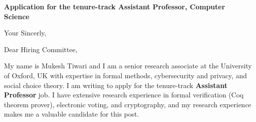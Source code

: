 \documentclass[11pt,a4paper,roman]{moderncv}
\begin{document}
\date{}
\opening{\textbf{Application for the tenure-track Assistant Professor, Computer Science}}
\closing{Your Sincerly, \vspace{-1em}}



\makelettertitle


Dear Hiring Committee, 
\\
\vspace{1em}

My name is Mukesh Tiwari and I am a senior research associate at 
the University of Oxford, UK with expertise in formal methods, cybersecurity and privacy, 
and social choice theory. I am writing to apply for the tenure-track \textbf{Assistant Professor} job. 
I have extensive research experience in
formal verification (Coq theorem prover), electronic voting, and cryptography, and my research 
experience makes me a valuable candidate for this post.
\end{document}
